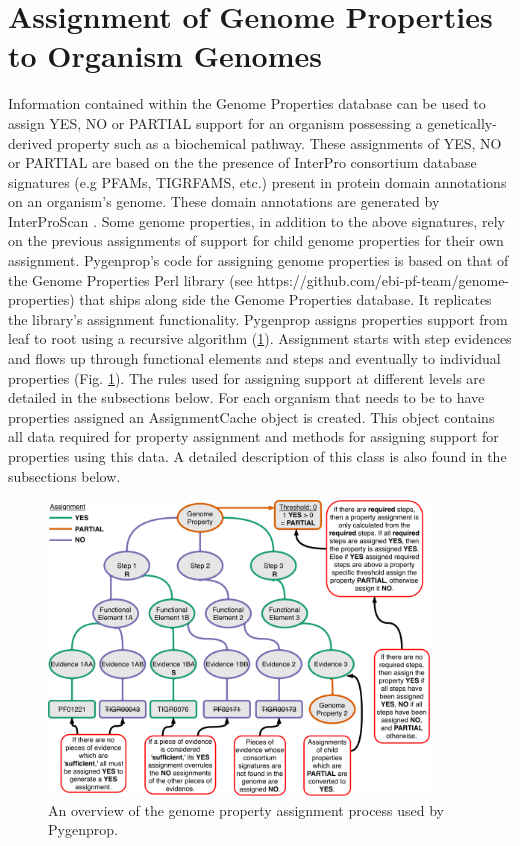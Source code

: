 \section{Assignment of Genome Properties to Organism Genomes}

Information contained within the Genome Properties database can be used to assign YES, NO or PARTIAL support for an organism possessing a genetically-derived property such as a biochemical pathway. These assignments of YES, NO or PARTIAL are based on the the presence of InterPro consortium database signatures (e.g PFAMs, TIGRFAMS, etc.) present in protein domain annotations on an organism's genome. These domain annotations are generated by InterProScan \cite{jones2014interproscan}. Some genome properties, in addition to the above signatures, rely on the previous assignments of support for child genome properties for their own assignment. Pygenprop's code for assigning genome properties is based on that of the Genome Properties Perl library (see https://github.com/ebi-pf-team/genome-properties) that ships along side the Genome Properties database. It replicates the library's assignment functionality. Pygenprop assigns properties support from leaf to root using a recursive algorithm (\ref{fig:propertyassignment}). Assignment starts with step evidences and flows up through functional elements and steps and eventually to individual properties (Fig. \ref{fig:propertyassignment}). The rules used for assigning support at different levels are detailed in the subsections below. For each organism that needs to be to have properties assigned an AssignmentCache object is created. This object contains all data required for property assignment and methods for assigning support for properties using this data. A detailed description of this class is also found in the subsections below.

\begin{figure}[!ht]
  \centering
	\includegraphics[width=0.90\textwidth]{media/Pygenprop_Assignment.pdf}
	 \caption{An overview of the genome property assignment process used by Pygenprop.}
	 \label{fig:propertyassignment}

\end{figure}

